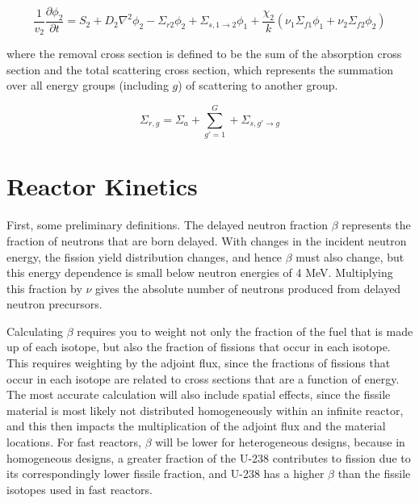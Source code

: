 \documentclass[10pt]{article}
\begin{document}
\begin{flushleft}
\begin{equation}
\label{Group2}
\frac{1}{v_2}\frac{\partial\phi_2}{\partial t}=S_2 + D_2\nabla^2\phi_2-\Sigma_{r2}\phi_2+\Sigma_{s, 1\rightarrow 2}\phi_1+\frac{\chi_2}{k}\left(\nu_1\Sigma_{f1}\phi_1+\nu_2\Sigma_{f2}\phi_2\right)
\end{equation}

where the removal cross section is defined to be the sum of the absorption cross section and the total scattering cross section, which represents the summation over all energy groups (including \(g\)) of scattering to another group. 

\begin{equation}
\label{RemovalCrossSection}
\Sigma_{r,g}=\Sigma_a+\sum_{g'=1}^{G}+\Sigma_{s, g'\rightarrow g}
\end{equation}











\section{Reactor Kinetics}

First, some preliminary definitions. The delayed neutron fraction \(\beta\) represents the fraction of neutrons that are born delayed. With changes in the incident neutron energy, the fission yield distribution changes, and hence \(\beta\) must also change, but this energy dependence is small below neutron energies of 4 MeV. Multiplying this fraction by \(\nu\) gives the absolute number of neutrons produced from delayed neutron precursors. 

Calculating \(\beta\) requires you to weight not only the fraction of the fuel that is made up of each isotope, but also the fraction of fissions that occur in each isotope. This requires weighting by the adjoint flux, since the fractions of fissions that occur in each isotope are related to cross sections that are a function of energy. The most accurate calculation will also include spatial effects, since the fissile material is most likely not distributed homogeneously within an infinite reactor, and this then impacts the multiplication of the adjoint flux and the material locations. For fast reactors, \(\beta\) will be lower for heterogeneous designs, because in homogeneous designs, a greater fraction of the U-238 contributes to fission due to its correspondingly lower fissile fraction, and U-238 has a higher \(\beta\) than the fissile isotopes used in fast reactors.


\end{flushleft}
\end{document}
